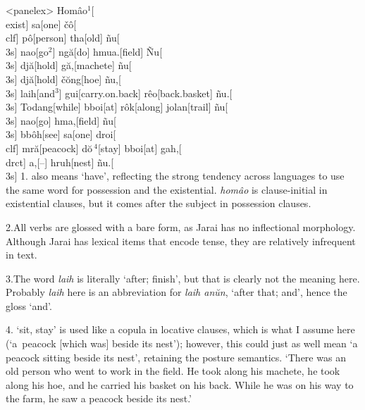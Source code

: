 \ex[everypanel=\footnotesize,glstyle=nlevel,glhangstyle=none,
   ssratio=.5]<panelex>
\beginglpanel
Hom\^{a}o$^1$[\\{exist}]  sa[one]  \v{c}\^{o}[\\{clf}]
p\^{o}[person]  tha[old]  \~{n}u[\\{3s}]  nao[go$^2$]
ng\u{a}[do]  hmua.[field]  \~{N}u[\\{3s}]  dj\u{a}[hold]
g\u{a},[machete]  \~{n}u[\\{3s}]  dj\u{a}[hold]
\v{c}\u{o}ng[hoe]  \~{n}u,[\\{3s}]  laih[and$^3$]
gui[carry.on.back]  r\^{e}o[back.basket]  \~{n}u.[\\{3s}]
Todang[while]  bboi[at]  r\^{o}k[along]  jolan[trail]
\~{n}u[\\{3s}]  nao[go]  hma,[field]  \~{n}u[\\{3s}]
bb\^{o}h[see]  sa[one]  droi[\\{clf}]  mr\u{a}[peacock]
d\u{o}$\,^4$[stay]  bboi[at]  gah,[\\{drct}]  a,[--]
hruh[nest]  \~{n}u.[\\{3s}]
\endgl
1. also means `have', reflecting the
strong tendency across languages to use the same word for
possession and the existential. {\it hom\^{a}o} is clause-initial
in existential clauses, but it comes after the subject in
possession clauses.

2.\enspace All verbs are glossed with a bare form, as Jarai has
no inflectional morphology. Although Jarai has lexical items that
encode tense, they are relatively infrequent in text.

3.\enspace The word {\it laih} is literally `after; finish', but
that is clearly not the meaning here. Probably {\it laih} here is
an abbreviation for {\it laih an\u{u}n}, `after that; and', hence
the gloss `and'.

4. `sit, stay' is used like a copula in
locative clauses, which is what I assume here (`a~peacock
[which was] beside its nest'); however, this could just as well
mean `a peacock sitting beside its nest', retaining the posture
semantics.
\endpanel
\bigskip
`There was an old person who went to work in the field. He took
along his machete, he took along his hoe, and he carried his
basket on his back. While he was on his way to the farm, he saw a
peacock beside its nest.'
\xe

